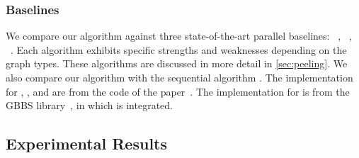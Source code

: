 \subsubsection{Baselines}
We compare our algorithm against three state-of-the-art parallel baselines: \Julienne~\cite{dhulipala2017}, \ParK~\cite{cheng2013local}, \PKC~\cite{kabir2017parallel}.
Each algorithm exhibits specific strengths and weaknesses depending on the graph types. 
These algorithms are discussed in more detail in \cref{sec:peeling}. 
We also compare our algorithm with the sequential algorithm \BZ{}. 
The implementation for \Park{}, \PKC{}, and \BZ{} are from the code of the \PKC{} paper~\cite{kabir2017parallel}.
The implementation for \Julienne{} is from the GBBS library~\cite{gbbs2021}, in which \Julienne{} is integrated. 


\subsection{Experimental Results}



